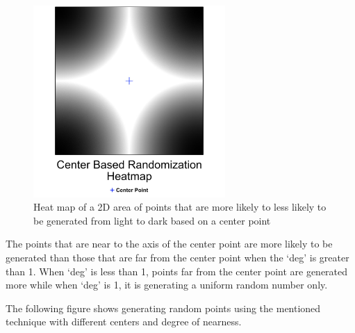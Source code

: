 \begin{figure}[ht]
\begin{center}
\includegraphics[width=0.65\textwidth]{img/cbr-map}
\caption{Heat map of a 2D area of points that are more likely to less likely to be generated from light to dark based on a center point}
\end{center}
\end{figure}

\par The points that are near to the axis of the center point are more likely to be generated than those that are far from the center point when the `deg' is greater than 1. When `deg' is less than 1, points far from the center point are generated more while when `deg' is 1, it is generating a uniform random number only.

\par The following figure shows generating random points using the mentioned technique with different centers and degree of nearness.

